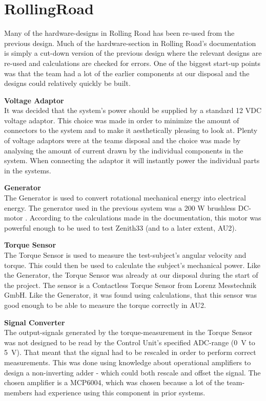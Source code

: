 \section{RollingRoad} 
Many of the hardware-designs in Rolling Road has been re-used from the previous design\cite{BAC_rullefelt}. Much of the hardware-section in Rolling Road's documentation\cite{RR} is simply a cut-down version of the previous design where the relevant designs are re-used and calculations are checked for errors. One of the biggest start-up points was that the team had a lot of the earlier components at our disposal and the designs could relatively quickly be built.

\textbf{Voltage Adaptor}\\ 
It was decided that the system's power should be supplied by a standard 12 VDC voltage adaptor. This choice was made in order to minimize the amount of connectors to the system and to make it aesthetically pleasing to look at. Plenty of voltage adaptors were at the teams disposal and the choice was made by analysing the amount of current drawn by the individual components in the system. When connecting the adaptor it will instantly power the individual parts in the systems.

\textbf{Generator}\\
The Generator is used to convert rotational mechanical energy into electrical energy. The generator used in the previous system\cite{BAC_rullefelt} was a 200 W brushless DC-motor \cite{Maxon}. According to the calculations made in the documentation\cite{RR}, this motor was powerful enough to be used to test Zenith33\cite{BAC_zenith33} (and to a later extent, AU2).

\textbf{Torque Sensor}\\
The Torque Sensor is used to measure the test-subject's angular velocity and torque. This could then be used to calculate the subject's mechanical power. Like the Generator, the Torque Sensor was already at our disposal during the start of the project. The sensor is a Contactless Torque Sensor from Lorenz Messtechnik GmbH\cite{TorqueSensor}. Like the Generator, it was found using calculations, that this sensor was good enough to be able to measure the torque correctly in AU2.

\textbf{Signal Converter}\\
The output-signals generated by the torque-measurement in the Torque Sensor was not designed to be read by the Control Unit's specified ADC-range (\SI{0}{\volt} to \SI{5}{\volt}). That meant that the signal had to be rescaled in order to perform correct measurements. This was done using knowledge about operational amplifiers to design a non-inverting adder - which could both rescale and offset the signal. The chosen amplifier is a MCP6004\cite{MCP6004}, which was chosen because a lot of the team-members had experience using this component in prior systems.

